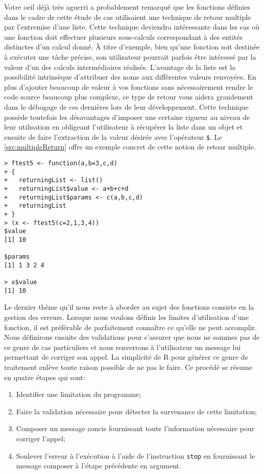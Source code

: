 \vspace{\baselineskip}
Votre oeil déjà très aguerri a probablement remarqué que les fonctions définies dans le cadre de cette étude de cas utilisaient une technique de retour multiple par l'entremise d'une liste. Cette technique deviendra intéressante dans les cas où une fonction doit effectuer plusieurs sous-calculs correspondant à des entités distinctes d'un calcul donné. À titre d'exemple, bien qu'une fonction soit destinée à exécuter une tâche précise, son utilisateur pourrait parfois être intéressé par la valeur d'un des calculs intermédiaires réalisés. L'avantage de la liste est la possibilité intrinsèque d'attribuer des noms aux différentes valeurs renvoyées. En plus d'ajouter beaucoup de valeur à vos fonctions sans nécessairement rendre le code source beaucoup plus complexe, ce type de retour vous aidera grandement dans le débogage de ces dernières lors de leur développement. Cette technique possède toutefois les désavantages d'imposer une certaine rigueur au niveau de leur utilisation en obligeant l'utilisateur à récupérer la liste dans un objet et ensuite de faire l'extraction de la valeur désirée avec l'opérateur \texttt{\$}. Le \autoref{src:multipleReturn} offre un exemple concret de cette notion de retour multiple.

\begin{lstlisting}[caption = Retour multiple par l'entremise d'une liste,label=src:multipleReturn]
> ftest5 <- function(a,b=3,c,d)
+ {
+   returningList <- list()
+   returningList$value <- a+b+c+d
+   returningList$params <- c(a,b,c,d)
+   returningList
+ }
> (x <- ftest5(c=2,1,3,4))
$value
[1] 10

$params
[1] 1 3 2 4

> x$value
[1] 10
\end{lstlisting}

\vspace{\baselineskip}
Le dernier thème qu'il nous reste à aborder au sujet des fonctions consiste en la gestion des erreurs. Lorsque nous voulons définir les limites d'utilisation d'une fonction, il est préférable de parfaitement connaître ce qu'elle ne peut accomplir. Nous définirons ensuite des validations pour s'assurer que nous ne sommes pas de ce genre de cas particuliers et nous renverrons à l'utilisateur un message lui permettant de corriger son appel. La simplicité de R pour générer ce genre de traitement enlève toute raison possible de ne pas le faire. Ce procédé se résume en quatre étapes qui sont:
\begin{enumerate}
	\item Identifier une limitation du programme;
	\item Faire la validation nécessaire pour détecter la survenance de cette limitation;
	\item Composer un message concis fournissant toute l'information nécessaire pour corriger l'appel;
	\item Soulever l'erreur à l'exécution à l'aide de l'instruction \texttt{stop} en fournissant le message composer à l'étape précédente en argument.
\end{enumerate}

